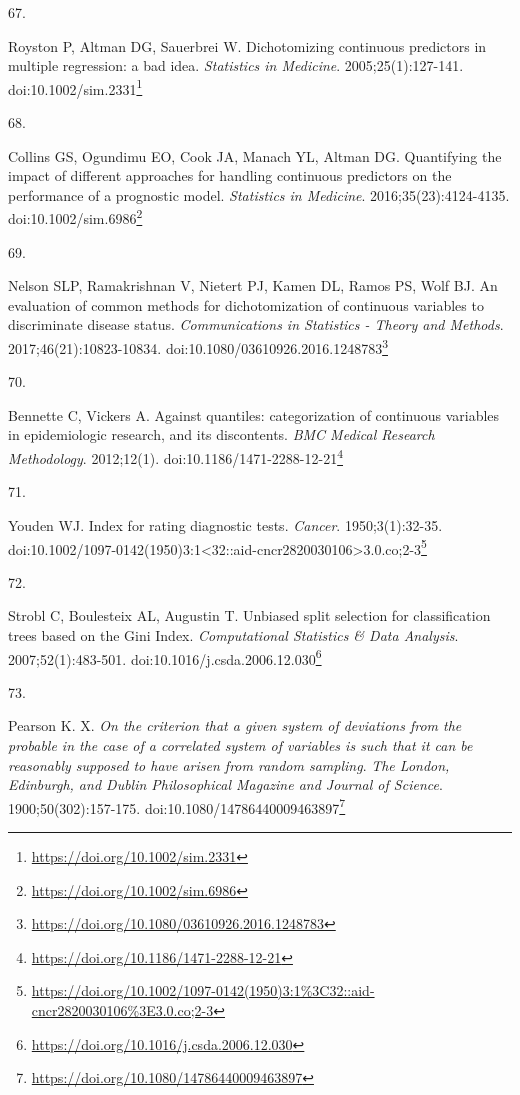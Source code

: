 \documentclass[
  a4paper,
]{book}
\newlength{\cslhangindent}
\newlength{\csllabelwidth}
\newlength{\cslentryspacingunit} %
\newenvironment{CSLReferences}[2] %
 {%
  \setlength{\parindent}{0pt}
  \ifodd #1
  \let\oldpar\par
  \def\par{\hangindent=\cslhangindent\oldpar}
  \fi
  \setlength{\parskip}{#2\cslentryspacingunit}
 }%
 {}
\newcommand{\CSLLeftMargin}[1]{\parbox[t]{\csllabelwidth}{#1}}
\newcommand{\CSLRightInline}[1]{\parbox[t]{\linewidth - \csllabelwidth}{#1}\break}
\renewcommand{\href}[2]{#2\footnote{\url{#1}}}
\begin{document}
\begin{CSLReferences}{0}{0}
\leavevmode{}%
\CSLLeftMargin{67. }%
\CSLRightInline{Royston P, Altman DG, Sauerbrei W. Dichotomizing continuous predictors in multiple regression: a bad idea. \emph{Statistics in Medicine}. 2005;25(1):127-141. doi:\href{https://doi.org/10.1002/sim.2331}{10.1002/sim.2331}}

\leavevmode{}%
\CSLLeftMargin{68. }%
\CSLRightInline{Collins GS, Ogundimu EO, Cook JA, Manach YL, Altman DG. Quantifying the impact of different approaches for handling continuous predictors on the performance of a prognostic model. \emph{Statistics in Medicine}. 2016;35(23):4124-4135. doi:\href{https://doi.org/10.1002/sim.6986}{10.1002/sim.6986}}

\leavevmode{}%
\CSLLeftMargin{69. }%
\CSLRightInline{Nelson SLP, Ramakrishnan V, Nietert PJ, Kamen DL, Ramos PS, Wolf BJ. An evaluation of common methods for dichotomization of continuous variables to discriminate disease status. \emph{Communications in Statistics - Theory and Methods}. 2017;46(21):10823-10834. doi:\href{https://doi.org/10.1080/03610926.2016.1248783}{10.1080/03610926.2016.1248783}}

\leavevmode{}%
\CSLLeftMargin{70. }%
\CSLRightInline{Bennette C, Vickers A. Against quantiles: categorization of continuous variables in epidemiologic research, and its discontents. \emph{BMC Medical Research Methodology}. 2012;12(1). doi:\href{https://doi.org/10.1186/1471-2288-12-21}{10.1186/1471-2288-12-21}}

\leavevmode{}%
\CSLLeftMargin{71. }%
\CSLRightInline{Youden WJ. Index for rating diagnostic tests. \emph{Cancer}. 1950;3(1):32-35. doi:\href{https://doi.org/10.1002/1097-0142(1950)3:1\%3C32::aid-cncr2820030106\%3E3.0.co;2-3}{10.1002/1097-0142(1950)3:1\textless32::aid-cncr2820030106\textgreater3.0.co;2-3}}

\leavevmode{}%
\CSLLeftMargin{72. }%
\CSLRightInline{Strobl C, Boulesteix AL, Augustin T. Unbiased split selection for classification trees based on the Gini Index. \emph{Computational Statistics \& Data Analysis}. 2007;52(1):483-501. doi:\href{https://doi.org/10.1016/j.csda.2006.12.030}{10.1016/j.csda.2006.12.030}}

\leavevmode{}%
\CSLLeftMargin{73. }%
\CSLRightInline{Pearson K. X. {\emph{On the criterion that a given system of deviations from the probable in the case of a correlated system of variables is such that it can be reasonably supposed to have arisen from random sampling}}. \emph{The London, Edinburgh, and Dublin Philosophical Magazine and Journal of Science}. 1900;50(302):157-175. doi:\href{https://doi.org/10.1080/14786440009463897}{10.1080/14786440009463897}}


\end{CSLReferences}
\end{document}
